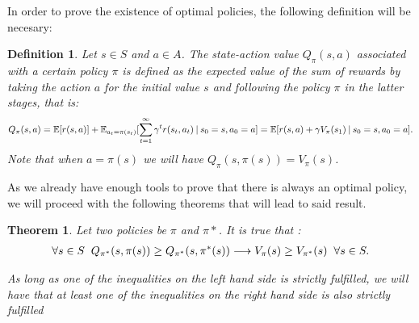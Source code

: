 \documentclass[12pt]{article}
\newtheorem{theorem}{Theorem}[section]
\newtheorem{definition}{Definition}[section]
\numberwithin{equation}{section}
\begin{document}
In order to prove  the existence of optimal policies, the following definition will be necesary:



\begin{definition}

    Let $s \in S$ and $a\in A$. The state-action value $Q_{\pi}(s,a)$ associated with a certain policy $\pi$ is defined as the expected value of the sum of rewards by taking the action $a$ for the initial value $s$ and  following the policy $\pi$ in the latter stages, that is:
    \begin{equation}
        Q_\pi(s,a)= \mathbb{E}[r(s,a)] +\mathbb{E}_{a_t=\pi(s_t)}[\sum_{t=1}^{\infty}\gamma^t r(s_t,a_t) \hspace{0.75mm} |\hspace{0.75mm} s_0=s,a_0=a]=\mathbb{E}[r(s,a) +\gamma V_{\pi}(s_1)\hspace{0.75mm} | \hspace{0.75mm} s_0=s,a_0=a].
    \end{equation}
    Note that when $a=\pi(s)$ we will have $Q_{\pi}(s,\pi(s))=V_{\pi}(s)$.
\end{definition}



As we already have enough tools to prove that there is always an optimal policy, we will proceed with the following theorems that will lead to said result.




\begin{theorem}
   Let two policies be $\pi$ and $\pi*$. It is true that :
     \begin{align}    
    \forall s \in S \hspace{2mm}Q_{\pi^*}(s,\pi(s)) \geq Q_{\pi^*}(s,\pi^*(s))  \longrightarrow  V_{\pi}(s) \geq V_{\pi^*}(s)  \hspace{2mm} \forall s \in S.
    \end{align}
    
    As long as one of the inequalities on the left hand side is strictly fulfilled, we will have that at least one of the inequalities on the right hand side is also strictly fulfilled
\end{theorem}
\end{document}
